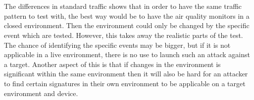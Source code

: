 \\\\
The differences in standard traffic shows that in order to have the same traffic pattern to test with, the best way would be to have the air quality monitors in a closed environment. Then the environment could only be changed by the specific event which are tested. However, this takes away the realistic parts of the test. The chance of identifying the specific events may be bigger, but if it is not applicable in a live environment, there is no use to launch such an attack against a target. Another aspect of this is that if changes in the environment is significant within the same environment then it will also be hard for an attacker to find certain signatures in their own environment to be applicable on a target environment and device. 